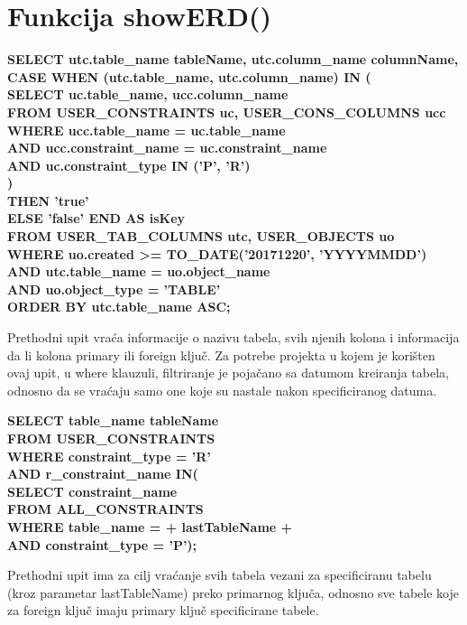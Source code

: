 \documentclass[12pt, a4paper]{report}
\theoremstyle{definition}
\begin{document}
\section{Funkcija showERD()}

\textbf{SELECT utc.table\_name tableName, utc.column\_name columnName,\\
CASE WHEN (utc.table\_name, utc.column\_name) IN ( \\
SELECT uc.table\_name, ucc.column\_name \\
FROM USER\_CONSTRAINTS uc, USER\_CONS\_COLUMNS ucc \\
WHERE ucc.table\_name = uc.table\_name \\
AND ucc.constraint\_name = uc.constraint\_name \\
AND uc.constraint\_type IN ('P', 'R')\\
) \\
THEN 'true' 		\\
ELSE 'false' END AS isKey \\
FROM USER\_TAB\_COLUMNS utc, USER\_OBJECTS uo \\
WHERE uo.created >= TO\_DATE('20171220', 'YYYYMMDD') \\
AND utc.table\_name = uo.object\_name \\
AND uo.object\_type = 'TABLE' \\
ORDER BY utc.table\_name ASC;}


Prethodni upit vraća informacije o nazivu tabela, svih njenih kolona i informacija da li kolona primary ili foreign ključ. Za potrebe projekta u kojem je korišten ovaj upit, u where klauzuli, filtriranje je pojačano sa datumom kreiranja tabela, odnosno da se vraćaju samo one koje su nastale nakon specificiranog datuma.

\textbf{SELECT table\_name tableName\\
FROM USER\_CONSTRAINTS \\
WHERE constraint\_type = 'R'\\
AND r\_constraint\_name IN(\\
SELECT constraint\_name\\
FROM ALL\_CONSTRAINTS \\
WHERE table\_name = + lastTableName + \\
AND constraint\_type = 'P');}

Prethodni upit ima za cilj vraćanje svih tabela vezani za specificiranu tabelu (kroz parametar lastTableName) preko primarnog ključa, odnosno sve tabele koje za foreign ključ imaju primary ključ specificirane tabele. 
\end{document}
